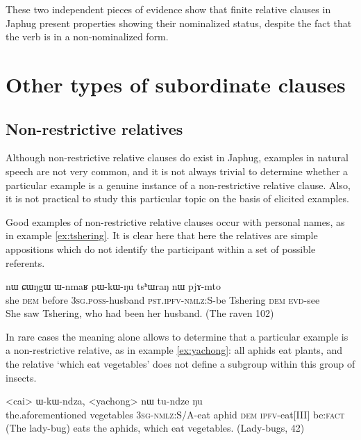 \documentclass[oldfontcommands,oneside,a4paper,11pt]{article}
\newcommand{\ipa}[1]{{\phon #1}} %
\newcommand{\topic}{\textsc{dem}}
\begin{document}
These two independent pieces of evidence show that finite relative clauses in Japhug present properties showing their nominalized status, despite the fact that the verb is in a non-nominalized form.

 
\section{Other types of subordinate clauses}  

\subsection{Non-restrictive relatives}  \label{sec:non.restrictive} 

Although non-restrictive relative clauses do exist in Japhug, examples in natural speech are not very common, and it is not always trivial to determine whether a particular example is a genuine instance of a non-restrictive relative clause. Also, it is not practical to study this particular topic on the basis of elicited examples.

Good examples of non-restrictive relative clauses occur with personal names,  as in example \ref{ex:tshering}. It is clear here that here the relatives are simple appositions which do not identify the participant within a set of possible referents.


\begin{exe}
   \ex \label{ex:tshering}
\gll  \ipa{ɯʑo}  	\ipa{nɯ} \ipa{ɕɯŋgɯ}  	\ipa{ɯ-nmaʁ}  	\ipa{pɯ-kɯ-ŋu}  	\ipa{tsʰɯraŋ}  	\ipa{nɯ}  	\ipa{pjɤ-mto}  	\\
she \textsc{dem} before \textsc{3sg.poss}-husband \textsc{pst.ipfv-nmlz:S}-be Tshering \topic{} \textsc{evd}-see \\
 \glt   She saw Tshering, who had been her husband. (The raven 102)
   \end{exe} 

In rare cases the meaning alone allows to determine that a particular example  is a non-restrictive relative, as in example \ref{ex:yachong}: all aphids eat plants, and the relative `which eat vegetables' does not define a subgroup within this group of insects.

\begin{exe}
   \ex  \label{ex:yachong}
\gll \ipa{iɕqʰa}  	<cai>  	\ipa{ɯ-kɯ-ndza},  	<yachong>  	\ipa{nɯ}  	\ipa{tu-ndze}  	\ipa{ŋu}  \\
the.aforementioned vegetables \textsc{3sg-nmlz:}S/A-eat aphid \topic{} \textsc{ipfv}-eat[III] be:\textsc{fact} \\
\glt (The lady-bug) eats the aphids, which eat vegetables. (Lady-bugs, 42)
\end{exe}
\end{document}
